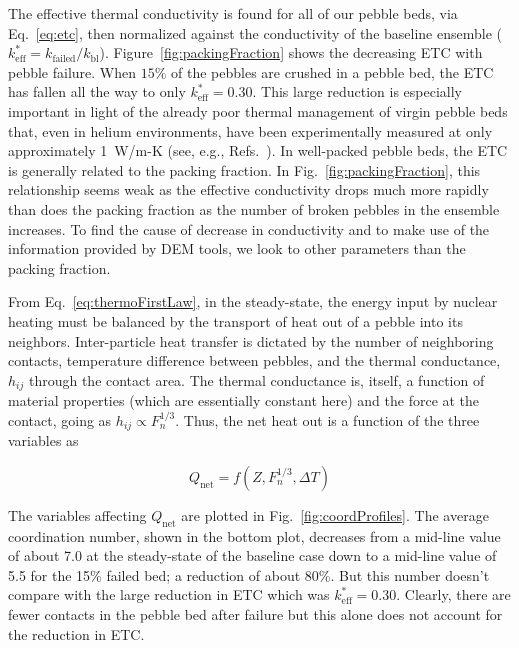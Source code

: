 The effective thermal conductivity is found for all of our pebble beds, via Eq.~\ref{eq:etc}, then normalized against the conductivity of the baseline ensemble ($k_\text{eff}^* = k_\text{failed}/k_\text{bl}$). Figure~\ref{fig:packingFraction} shows the decreasing ETC with pebble failure. When $15\%$ of the pebbles are crushed in a pebble bed, the ETC has fallen all the way to only $k_\text{eff}^*=0.30$. This large reduction is especially important in light of the already poor thermal management of virgin pebble beds that, even in helium environments, have been experimentally measured at only approximately 1~W/m-K (see, { e.g.}, Refs.~\cite{Reimann:2002mi, Piazza2002}). In well-packed pebble beds, the ETC is generally related to the packing fraction. In Fig.~\ref{fig:packingFraction}, this relationship seems weak as the effective conductivity drops much more rapidly than does the packing fraction as the number of broken pebbles in the ensemble increases. To find the cause of decrease in conductivity and to make use of the information provided by DEM tools, we look to other parameters than the packing fraction.

From Eq.~\ref{eq:thermoFirstLaw}, in the steady-state, the energy input by nuclear heating must be balanced by the transport of heat out of a pebble into its neighbors. Inter-particle heat transfer is dictated by the number of neighboring contacts, temperature difference between pebbles, and the thermal conductance, $h_{ij}$ through the contact area. The thermal conductance is, itself, a function of material properties  (which are essentially constant here) and the force at the contact, going as $h_{ij} \propto F_n^{1/3}$. Thus, the net heat out is a function of the three variables as

\begin{equation}
	Q_\text{net} =f( Z, F_n^{1/3}, \Delta T)
\end{equation}



The variables affecting $Q_\text{net}$ are plotted in Fig.~\ref{fig:coordProfiles}. The average coordination number, shown in the bottom plot, decreases from a mid-line value of about 7.0 at the steady-state of the baseline case down to a mid-line value of 5.5 for the 15\% failed bed; a reduction of about 80\%. But this number doesn't compare with the large reduction in ETC which was $k_\text{eff}^*=0.30$. Clearly, there are fewer contacts in the pebble bed after failure but this alone does not account for the reduction in ETC.

